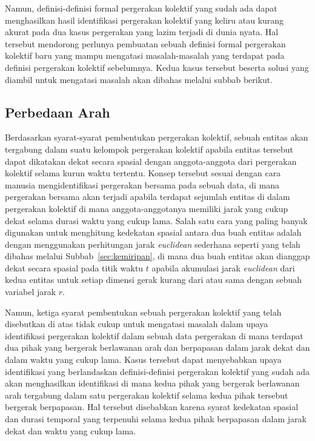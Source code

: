 Namun, definisi-definisi formal pergerakan kolektif yang sudah ada dapat menghasilkan hasil identifikasi pergerakan kolektif yang keliru atau kurang akurat pada dua kasus pergerakan yang lazim terjadi di dunia nyata. Hal tersebut mendorong perlunya pembuatan sebuah definisi formal pergerakan kolektif baru yang mampu mengatasi masalah-masalah yang terdapat pada definisi pergerakan kolektif sebelumnya. Kedua kasus tersebut beserta solusi yang diambil untuk mengatasi masalah akan dibahas melalui subbab berikut.

\subsection{Perbedaan Arah}
\label{subsec:beda-arah}
    
Berdasarkan syarat-syarat pembentukan pergerakan kolektif, sebuah entitas akan tergabung dalam suatu kelompok pergerakan kolektif apabila entitas tersebut dapat dikatakan dekat secara spasial dengan anggota-anggota dari pergerakan kolektif selama kurun waktu tertentu. Konsep tersebut sesuai dengan cara manusia mengidentifikasi pergerakan bersama pada sebuah data, di mana pergerakan bersama akan terjadi apabila terdapat sejumlah entitas di dalam pergerakan kolektif di mana anggota-anggotanya memiliki jarak yang cukup dekat selama durasi waktu yang cukup lama. Salah satu cara yang paling banyak digunakan untuk menghitung kedekatan spasial antara dua buah entitas adalah dengan menggunakan perhitungan jarak \textit{euclidean} sederhana seperti yang telah dibahas melalui Subbab~\ref{sec:kemiripan}, di mana dua buah entitas akan dianggap dekat secara spasial pada titik waktu $t$ apabila akumulasi jarak \textit{euclidean} dari kedua entitas untuk setiap dimensi gerak kurang dari atau sama dengan sebuah variabel jarak $r$.

Namun, ketiga syarat pembentukan sebuah pergerakan kolektif yang telah disebutkan di atas tidak cukup untuk mengatasi masalah dalam upaya identifikasi pergerakan kolektif dalam sebuah data pergerakan di mana terdapat dua pihak yang bergerak berlawanan arah dan berpapasan dalam jarak dekat dan dalam waktu yang cukup lama. Kasus tersebut dapat menyebabkan upaya identifikasi yang berlandaskan definisi-definisi pergerakan kolektif yang sudah ada akan menghasilkan identifikasi di mana kedua pihak yang bergerak berlawanan arah tergabung dalam satu pergerakan kolektif selama kedua pihak tersebut bergerak berpapasan. Hal tersebut disebabkan karena syarat kedekatan spasial dan durasi temporal yang terpenuhi selama kedua pihak berpapasan dalam jarak dekat dan waktu yang cukup lama.
    
